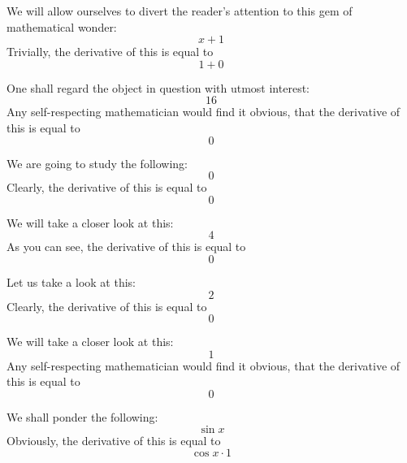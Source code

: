 \documentclass{article}
\begin{document}
We will allow ourselves to divert the reader's attention to this gem of mathematical wonder:
\begin{equation}
x + 1 
\end{equation}
Trivially, the derivative of this is equal to
\begin{equation}
1 + 0 
\end{equation}

One shall regard the object in question with utmost interest:
\begin{equation}
16 
\end{equation}
Any self-respecting mathematician would find it obvious, that the derivative of this is equal to
\begin{equation}
0 
\end{equation}

We are going to study the following:
\begin{equation}
0 
\end{equation}
Clearly, the derivative of this is equal to
\begin{equation}
0 
\end{equation}

We will take a closer look at this:
\begin{equation}
4 
\end{equation}
As you can see, the derivative of this is equal to
\begin{equation}
0 
\end{equation}

Let us take a look at this:
\begin{equation}
2 
\end{equation}
Clearly, the derivative of this is equal to
\begin{equation}
0 
\end{equation}

We will take a closer look at this:
\begin{equation}
1 
\end{equation}
Any self-respecting mathematician would find it obvious, that the derivative of this is equal to
\begin{equation}
0 
\end{equation}

We shall ponder the following:
\begin{equation}
\sin x 
\end{equation}
Obviously, the derivative of this is equal to
\begin{equation}
\cos x \cdot 1 
\end{equation}
\end{document}
